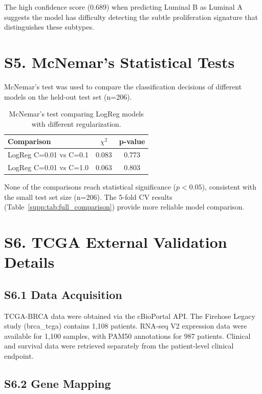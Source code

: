 \documentclass[11pt,a4paper]{article}
\begin{document}
The high confidence score (0.689) when predicting Luminal B as Luminal A suggests the model has difficulty detecting the subtle proliferation signature that distinguishes these subtypes.

\section*{S5. McNemar's Statistical Tests}
\label{supp:mcnemar}

McNemar's test was used to compare the classification decisions of different models on the held-out test set (n=206).

\begin{table}[H]
\centering
\caption{McNemar's test comparing LogReg models with different regularization.}
\label{supp:tab:mcnemar}
\begin{tabular}{lcc}
\toprule
\textbf{Comparison} & $\chi^2$ & \textbf{p-value} \\
\midrule
LogReg C=0.01 vs C=0.1 & 0.083 & 0.773 \\
LogReg C=0.01 vs C=1.0 & 0.063 & 0.803 \\
\bottomrule
\end{tabular}
\end{table}

None of the comparisons reach statistical significance ($p < 0.05$), consistent with the small test set size (n=206). The 5-fold CV results (Table~\ref{supp:tab:full_comparison}) provide more reliable model comparison.

\section*{S6. TCGA External Validation Details}
\label{supp:tcga}

\subsection*{S6.1 Data Acquisition}

TCGA-BRCA data were obtained via the cBioPortal API. The Firehose Legacy study (brca\_tcga) contains 1,108 patients. RNA-seq V2 expression data were available for 1,100 samples, with PAM50 annotations for 987 patients. Clinical and survival data were retrieved separately from the patient-level clinical endpoint.

\subsection*{S6.2 Gene Mapping}
\end{document}
